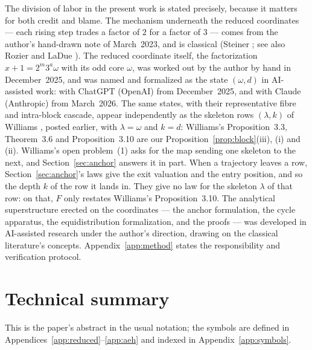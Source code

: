 \documentclass[11pt]{article}
\theoremstyle{remark}
\newcommand{\w}{\omega}
\begin{document}
The division of labor in the present work is stated precisely, because it matters for both credit and blame. The mechanism underneath the reduced coordinates --- each rising step trades a factor of $2$ for a factor of $3$ --- comes from the author's hand-drawn note of March~2023, and is classical (Steiner \cite{steiner}; see also Rozier \cite{rozier90} and LaDue \cite{ladue}). The reduced coordinate itself, the factorization $x + 1 = 2^m 3^a \w$ with its odd core $\w$, was worked out by the author by hand in December~2025, and was named and formalized as the state $(\w,d)$ in AI-assisted work: with ChatGPT (OpenAI) from December~2025, and with Claude (Anthropic) from March~2026. The same states, with their representative fibre and intra-block cascade, appear independently as the skeleton rows $(\lambda,k)$ of Williams \cite{williams}, posted earlier, with $\lambda = \w$ and $k = d$: Williams's Proposition~3.3, Theorem~3.6 and Proposition~3.10 are our Proposition~\ref{prop:block}(iii), (i) and (ii). Williams's open problem~(1) \cite[p.~18]{williams} asks for the map sending one skeleton to the next, and Section~\ref{sec:anchor} answers it in part. When a trajectory leaves a row, Section~\ref{sec:anchor}'s laws give the exit valuation and the entry position, and so the depth $k$ of the row it lands in. They give no law for the skeleton $\lambda$ of that row: on that, $F$ only restates Williams's Proposition~3.10. The analytical superstructure erected on the coordinates --- the anchor formulation, the cycle apparatus, the equidistribution formalization, and the proofs --- was developed in AI-assisted research under the author's direction, drawing on the classical literature's concepts. Appendix~\ref{app:method} states the responsibility and verification protocol.


\appendix

\section*{Technical summary}

This is the paper's abstract in the usual notation; the symbols are defined in Appendices~\ref{app:reduced}--\ref{app:aeh} and indexed in Appendix~\ref{app:symbols}.
\end{document}
